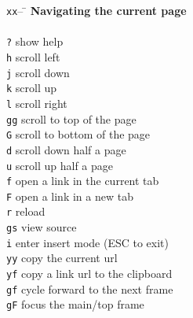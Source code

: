 \documentclass{article}
\newcommand{\tabhead}{\texttt{xx}-- \= \kill}
\begin{document}
  \thispagestyle{empty}
  
  \begin{multicols*}{4}
    \begin{tabbing}
      \tabhead
      \textbf{Navigating the current page} \\
      \\
      \texttt{?}  \> show help \\
      \texttt{h}  \> scroll left \\
      \texttt{j}  \> scroll down \\
      \texttt{k}  \> scroll up \\
      \texttt{l}  \> scroll right \\
      \texttt{gg} \> scroll to top of the page \\
      \texttt{G}  \> scroll to bottom of the page \\
      \texttt{d}  \> scroll down half a page \\
      \texttt{u}  \> scroll up half a page \\
      \texttt{f}  \> open a link in the current tab \\
      \texttt{F}  \> open a link in a new tab \\
      \texttt{r}  \> reload \\
      \texttt{gs} \> view source \\
      \texttt{i}  \> enter insert mode (ESC to exit) \\
      \texttt{yy} \> copy the current url \\
      \texttt{yf} \> copy a link url to the clipboard \\
      \texttt{gf} \> cycle forward to the next frame \\
      \texttt{gF} \> focus the main/top frame \\
    \end{tabbing}
    
    \columnbreak
    

\end{multicols*}
\end{document}
